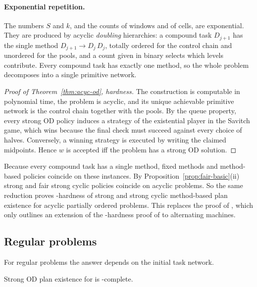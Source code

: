 \paragraph{Exponential repetition.}
The numbers $S$ and $k$, and the counts of windows and of cells, are exponential. They are produced
by acyclic \emph{doubling} hierarchies: a compound task $D_{j+1}$ has the single method
$D_{j+1}\to D_j\,D_j$, totally ordered for the control chain and unordered for the pools, and a
count given in binary selects which levels contribute. Every compound task has exactly one method,
so the whole problem decomposes into a single primitive network.

\begin{proof}[Proof of Theorem~\ref{thm:acyc-od}, hardness]
  The construction is computable in polynomial time, the problem is acyclic, and its unique
  achievable primitive network is the control chain together with the pools. By the queue property,
  every strong OD policy induces a strategy of the existential player in the Savitch game, which
  wins because the final check must succeed against every choice of halves. Conversely, a winning
  strategy is executed by writing the claimed midpoints. Hence $w$ is accepted iff the problem has
  a strong OD solution.
\end{proof}

Because every compound task has a single method, fixed methods and method-based policies coincide
on these instances. By Proposition~\ref{prop:fair-basic}(ii) strong and fair strong cyclic
policies coincide on acyclic problems. So the same reduction proves \EXPSPACE-hardness of strong
and strong cyclic method-based plan existence for acyclic partially ordered problems. This replaces
the proof of \textcite[Thm.~2]{chen:bercher:icaps-22}, which only outlines an extension of the
\NEXPTIME-hardness proof of \textcite{alford:et:al:icaps-15} to alternating machines.

\subsection{Regular problems}\label{sec:fixed-reg}

For regular problems the answer depends on the initial task network.

\begin{theorem}\label{thm:regtn}
  Strong OD plan existence for \REGtn{} is \EXPSPACE-complete.
\end{theorem}

